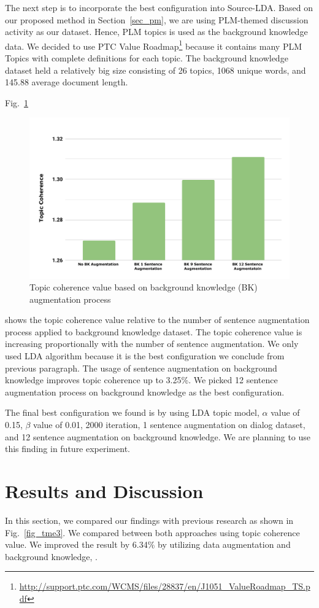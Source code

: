 \documentclass[10pt, conference, compsocconf]{IEEEtran}
\begin{document}
The next step is to incorporate the best configuration into  Source-LDA. Based on our proposed method in Section~\ref{sec_pm}, we are using PLM-themed discussion activity as our dataset. Hence, PLM topics is used as the background knowledge data. We decided to use PTC Value Roadmap\footnote{\url{http://support.ptc.com/WCMS/files/28837/en/J1051_ValueRoadmap_TS.pdf}} because it contains many PLM Topics with complete definitions for each topic. The background knowledge dataset held a relatively big size consisting of 26 topics, 1068 unique words, and 145.88 average document length. 

Fig.~\ref{fig_tme2}
\begin{figure}[t]
	\includegraphics[scale=0.425]{new-topic2.pdf}
	\caption{Topic coherence value based on background knowledge (BK) augmentation process}
\label{fig_tme2}
\end{figure}
shows the topic coherence value relative to the number of sentence augmentation process applied to background knowledge dataset. The topic coherence value is increasing proportionally with the number of sentence augmentation. We only used LDA algorithm because it is the best configuration we conclude from previous paragraph. The usage of sentence augmentation on background knowledge improves topic coherence up to 3.25\%. We picked 12 sentence augmentation process on background knowledge as the best configuration.

The final best configuration we found is by using LDA topic model, $\alpha$ value of 0.15, $\beta$ value of 0.01, 2000 iteration, 1 sentence augmentation on dialog dataset, and 12 sentence augmentation on background knowledge. We are planning to use this finding in future experiment.

\section{Results and Discussion}
In this section, we compared our findings with previous research\cite{b4} as shown in Fig.~\ref{fig_tme3}. We compared between both approaches using topic coherence value. We improved the result by 6.34\% by utilizing data augmentation and background knowledge, .
\end{document}
